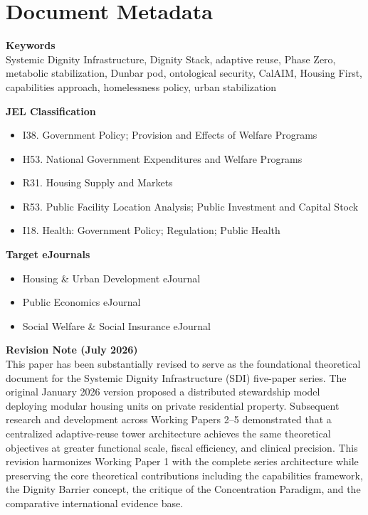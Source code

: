 \documentclass[12pt, letterpaper]{article}
\begin{document}

\newpage
\section*{Document Metadata}

{\footnotesize{}

\noindent\textbf{Keywords}\\[1pt]
Systemic Dignity Infrastructure, Dignity Stack, adaptive reuse, Phase Zero, metabolic stabilization, Dunbar pod, ontological security, CalAIM, Housing First, capabilities approach, homelessness policy, urban stabilization

\vspace{8pt}
\noindent\textbf{JEL Classification}
\begin{itemize}[nosep, before={\vspace{-8pt}}, leftmargin=2em]
    \item I38. Government Policy; Provision and Effects of Welfare Programs
    \item H53. National Government Expenditures and Welfare Programs
    \item R31. Housing Supply and Markets
    \item R53. Public Facility Location Analysis; Public Investment and Capital Stock
    \item I18. Health: Government Policy; Regulation; Public Health
\end{itemize}

\vspace{8pt}
\noindent\textbf{Target eJournals}
\begin{itemize}[nosep, before={\vspace{-8pt}}, leftmargin=2em]
    \item Housing \& Urban Development eJournal
    \item Public Economics eJournal
    \item Social Welfare \& Social Insurance eJournal
\end{itemize}

\vspace{8pt}
\noindent\textbf{Revision Note (July 2026)}\\[1pt]
This paper has been substantially revised to serve as the foundational theoretical document for the Systemic Dignity Infrastructure (SDI) five-paper series. The original January 2026 version proposed a distributed stewardship model deploying modular housing units on private residential property. Subsequent research and development across Working Papers 2--5 demonstrated that a centralized adaptive-reuse tower architecture achieves the same theoretical objectives at greater functional scale, fiscal efficiency, and clinical precision. This revision harmonizes Working Paper 1 with the complete series architecture while preserving the core theoretical contributions including the capabilities framework, the Dignity Barrier concept, the critique of the Concentration Paradigm, and the comparative international evidence base.



}
\end{document}
